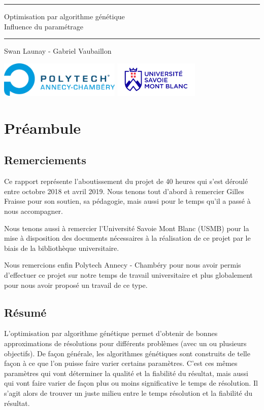 \documentclass[12pt]{report}
\begin{document}
  \begin{titlepage}
    \centering
        \vfill
        {\rule{\linewidth}{.5pt}
        \huge
            Optimisation par algorithme génétique\\
          \large
            Influence du paramétrage\\
          \rule{\linewidth}{.5pt}
            \vskip2cm
            Swan Launay - Gabriel Vaubaillon\\
        }
        \vfill
        \includegraphics[height=1.7cm]{logo/polytech.jpg}
        \hfill
        \includegraphics[height=1.7cm]{logo/usmb.png}
  \end{titlepage}
  \chapter{Préambule}
    \section{Remerciements}
      Ce rapport représente l'aboutissement du projet de 40 heures qui s'est déroulé entre octobre 2018 et avril 2019. Nous tenons tout d'abord à remercier Gilles Fraisse pour son soutien, sa pédagogie, mais aussi pour le temps qu'il a passé à nous accompagner.

      Nous tenons aussi à remercier l'Université Savoie Mont Blanc (USMB) pour la mise à disposition des documents nécessaires à la réalisation de ce projet par le biais de la bibliothèque universitaire.

      Nous remercions enfin Polytech Annecy - Chambéry pour nous avoir permis d'effectuer ce projet sur notre temps de travail universitaire et plus globalement pour nous avoir proposé un travail de ce type.

    \section{Résumé}
      L'optimisation par algorithme génétique permet d'obtenir de bonnes approximations de résolutions pour différents problèmes (avec un ou plusieurs objectifs). De façon générale, les algorithmes génétiques sont construits de telle façon à ce que l'on puisse faire varier certains paramètres. C'est ces mêmes paramètres qui vont déterminer la qualité et la fiabilité du résultat, mais aussi qui vont faire varier de façon plus ou moins significative le temps de résolution. Il s'agit alors de trouver un juste milieu entre le temps résolution et la fiabilité du résultat.
\end{document}
